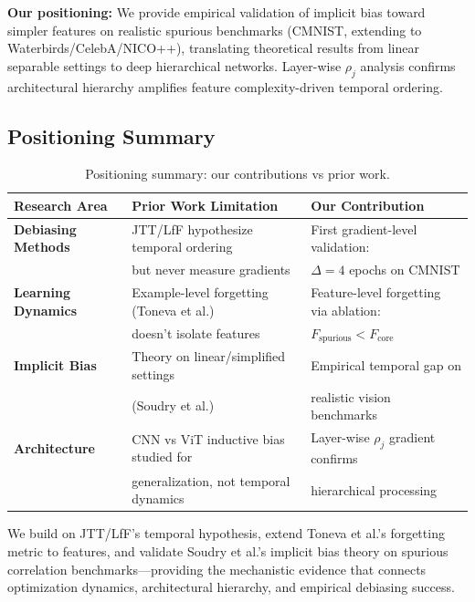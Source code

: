 \textbf{Our positioning:} We provide empirical validation of implicit bias toward simpler features on realistic spurious benchmarks (CMNIST, extending to Waterbirds/CelebA/NICO++), translating theoretical results from linear separable settings to deep hierarchical networks. Layer-wise $\rho_j$ analysis confirms architectural hierarchy amplifies feature complexity-driven temporal ordering.

\subsection{Positioning Summary}

\begin{table}[h]
\centering
\small
\begin{tabular}{@{}lll@{}}
\toprule
\textbf{Research Area} & \textbf{Prior Work Limitation} & \textbf{Our Contribution} \\
\midrule
\textbf{Debiasing Methods} & JTT/LfF hypothesize temporal ordering & First gradient-level validation: \\
& but never measure gradients & $\Delta=4$ epochs on CMNIST \\
\midrule
\textbf{Learning Dynamics} & Example-level forgetting (Toneva et al.) & Feature-level forgetting via ablation: \\
& doesn't isolate features & $F_{\text{spurious}} < F_{\text{core}}$ \\
\midrule
\textbf{Implicit Bias} & Theory on linear/simplified settings & Empirical temporal gap on \\
& (Soudry et al.) & realistic vision benchmarks \\
\midrule
\textbf{Architecture} & CNN vs ViT inductive bias studied for & Layer-wise $\rho_j$ gradient confirms \\
& generalization, not temporal dynamics & hierarchical processing \\
\bottomrule
\end{tabular}
\caption{Positioning summary: our contributions vs prior work.}
\label{tab:positioning}
\end{table}

We build on JTT/LfF's temporal hypothesis, extend Toneva et al.'s forgetting metric to features, and validate Soudry et al.'s implicit bias theory on spurious correlation benchmarks---providing the mechanistic evidence that connects optimization dynamics, architectural hierarchy, and empirical debiasing success.

